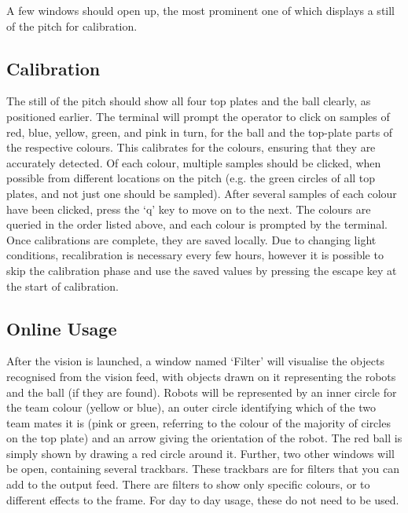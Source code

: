 A few windows should open up, the most prominent one of which displays a still
of the pitch for calibration.

\subsection{Calibration}

The still of the pitch should show all four top plates and the ball clearly,
as positioned earlier. The terminal will prompt the operator to click on
samples of red, blue, yellow, green, and pink in turn, for the ball and the
top-plate parts of the respective colours. This calibrates for the colours,
ensuring that they are accurately detected. Of each colour, multiple samples
should be clicked, when possible from different locations on the pitch (e.g.
the green circles of all top plates, and not just one should be sampled). After
several samples of each colour have been clicked, press the `q' key to move on
to the next. The colours are queried in the order listed above, and each colour
is prompted by the terminal. Once calibrations are complete, they are saved
locally. Due to changing light conditions, recalibration is necessary every few
hours, however it is possible to skip the calibration phase and use the saved
values by pressing the escape key at the start of calibration.

\subsection{Online Usage}

After the vision is launched, a window named `Filter' will visualise the
objects recognised from the vision feed, with objects drawn on it representing
the robots and the ball (if they are found). Robots will be represented by an
inner circle for the team colour (yellow or blue), an outer circle identifying
which of the two team mates it is (pink or green, referring to the colour of
the majority of circles on the top plate) and an arrow giving the orientation
of the robot. The red ball is simply shown by drawing a red circle around it.
Further, two other windows will be open, containing several trackbars. These
trackbars are for filters that you can add to the output feed. There are
filters to show only specific colours, or to different effects to the frame.
For day to day usage, these do not need to be used.

